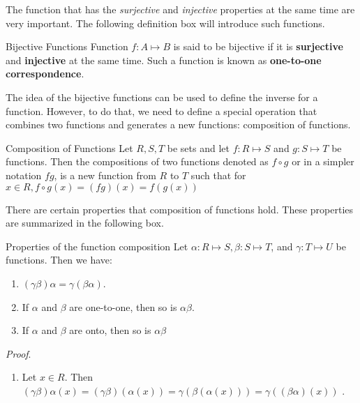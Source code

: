 The function that has the \textit{surjective} and \textit{injective} properties at the same time are very important. The following definition box will introduce such functions.

\begin{defbox}{Bijective Functions}
	Function $f: A \mapsto B$ is said to be bijective if it is \textbf{surjective} and \textbf{injective} at the same time. Such a function is known as \textbf{one-to-one correspondence}.
\end{defbox}

The idea of the bijective functions can be used to define the inverse for a function. However, to do that, we need to define a special operation that combines two functions and generates a new functions: composition of functions.

\begin{defbox}{Composition of Functions}
	Let $R, S, T$ be sets and let $f: R \mapsto S$ and $g: S \mapsto T$ be functions. Then the compositions of two functions denoted as $f \circ g$ or in a simpler notation $fg$, is a new function from $R$ to $T$ such that for $x \in R, f \circ g (x) = (fg)(x) = f(g(x))$
\end{defbox}

There are certain properties that composition of functions hold. These properties are summarized in the following box.

\begin{thmbox}{Properties of the function composition}
	Let $\alpha: R \mapsto S, \beta: S \mapsto T$, and $\gamma: T \mapsto U$ be functions. Then we have:
	\begin{enumerate}
		\item $(\gamma \beta) \alpha = \gamma (\beta \alpha)$.
		\item If $\alpha$ and $\beta$ are one-to-one, then so is $\alpha \beta$.
		\item If $\alpha$ and $\beta$ are onto, then so is $\alpha \beta$
		
	\end{enumerate}
\end{thmbox}  

\textit{Proof}. \begin{enumerate}
	\item Let $x \in R$. Then $(\gamma \beta) \alpha (x) = (\gamma \beta)(\alpha (x)) = \gamma (\beta (\alpha (x))) = \gamma ((\beta \alpha) (x)) $ .
\end{enumerate}



